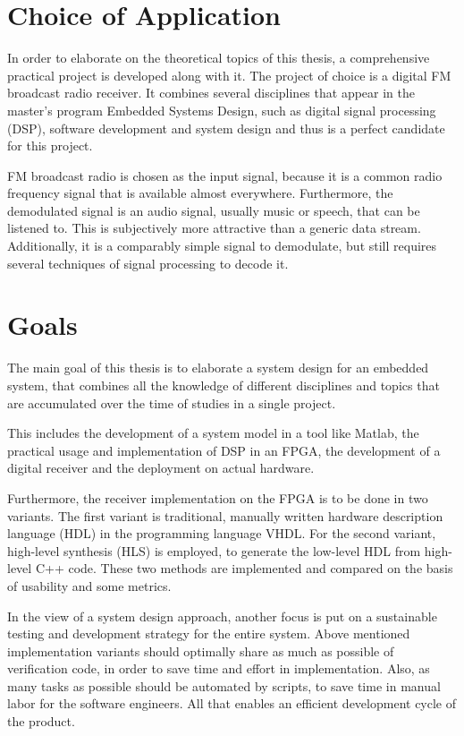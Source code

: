 \section{Choice of Application}

In order to elaborate on the theoretical topics of this thesis, a comprehensive practical project is developed along with it.
The project of choice is a digital FM broadcast radio receiver.
It combines several disciplines that appear in the master's program Embedded Systems Design, such as digital signal processing (DSP), software development and system design and thus is a perfect candidate for this project.

FM broadcast radio is chosen as the input signal, because it is a common radio frequency signal that is available almost everywhere.
Furthermore, the demodulated signal is an audio signal, usually music or speech, that can be listened to.
This is subjectively more attractive than a generic data stream.
Additionally, it is a comparably simple signal to demodulate, but still requires several techniques of signal processing to decode it.

\section{Goals}

The main goal of this thesis is to elaborate a system design for an embedded system, that combines all the knowledge of different disciplines and topics that are accumulated over the time of studies in a single project.

This includes the development of a system model in a tool like Matlab, the practical usage and implementation of DSP in an FPGA, the development of a digital receiver and the deployment on actual hardware.

Furthermore, the receiver implementation on the FPGA is to be done in two variants.
The first variant is traditional, manually written hardware description language (HDL) in the programming language VHDL.
For the second variant, high-level synthesis (HLS) is employed, to generate the low-level HDL from high-level C++ code.
These two methods are implemented and compared on the basis of usability and some metrics.

In the view of a system design approach, another focus is put on a sustainable testing and development strategy for the entire system.
Above mentioned implementation variants should optimally share as much as possible of verification code, in order to save time and effort in implementation.
Also, as many tasks as possible should be automated by scripts, to save time in manual labor for the software engineers.
All that enables an efficient development cycle of the product.


